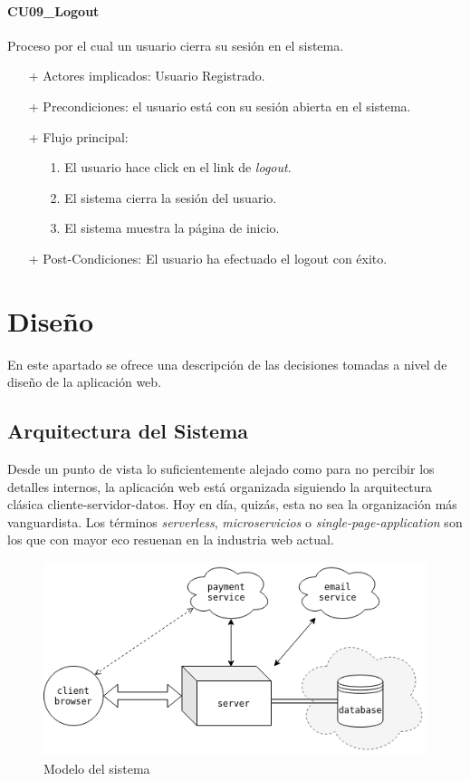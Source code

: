 \documentclass[a4paper]{article}
\begin{document}
            \paragraph{CU09\_Logout}
                Proceso por el cual un usuario cierra su sesión en el sistema.
                \begin{itemize}
                    \item[+] Actores implicados: Usuario Registrado.
                    \item[+] Precondiciones: el usuario está con su sesión abierta en el sistema.
                    \item[+] Flujo principal:
                    \begin{enumerate}
                        \item[1.] El usuario hace click en el link de \emph{logout}.
                        \item[2.] El sistema cierra la sesión del usuario.
                        \item[3.] El sistema muestra la página de inicio.
                    \end{enumerate}
                    \item[+] Post-Condiciones: El usuario ha efectuado el logout con éxito.
                \end{itemize}


    \section{Diseño}
    En este apartado se ofrece una descripción de las decisiones tomadas a nivel de diseño de la aplicación web.
    \subsection{Arquitectura del Sistema}
    Desde un punto de vista lo suficientemente alejado como para no percibir los detalles internos, la aplicación web está organizada siguiendo la arquitectura clásica cliente-servidor-datos. Hoy en día, quizás, esta no sea la organización más vanguardista. Los términos \emph{serverless}, \emph{microservicios} o \emph{single-page-application} son los que con mayor eco resuenan en la industria web actual.
    
    \begin{figure}[h]
    	\centering
    	\includegraphics[width=\textwidth]{desing_general}
    	\caption{Modelo del sistema}
    	\label{fig:desing_general}
    \end{figure}
    
\end{document}
